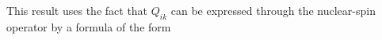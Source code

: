 This result uses the fact that $Q_{ik}$ can be expressed through the nuclear-spin operator by a formula of the form
